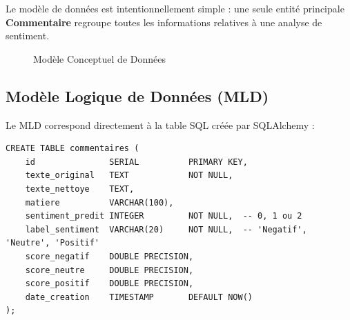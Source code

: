Le modèle de données est intentionnellement simple : une seule entité
principale \textbf{Commentaire} regroupe toutes les informations relatives
à une analyse de sentiment.

\begin{figure}[H]
\centering
{}
\caption{Modèle Conceptuel de Données}
\label{fig:mcd}
\end{figure}

\subsection{Modèle Logique de Données (MLD)}

Le MLD correspond directement à la table SQL créée par SQLAlchemy :

\begin{lstlisting}[style=styleSQL, caption={Schéma SQL de la table commentaires}, label={lst:sql_schema}]
CREATE TABLE commentaires (
    id               SERIAL          PRIMARY KEY,
    texte_original   TEXT            NOT NULL,
    texte_nettoye    TEXT,
    matiere          VARCHAR(100),
    sentiment_predit INTEGER         NOT NULL,  -- 0, 1 ou 2
    label_sentiment  VARCHAR(20)     NOT NULL,  -- 'Negatif', 'Neutre', 'Positif'
    score_negatif    DOUBLE PRECISION,
    score_neutre     DOUBLE PRECISION,
    score_positif    DOUBLE PRECISION,
    date_creation    TIMESTAMP       DEFAULT NOW()
);
\end{lstlisting}

